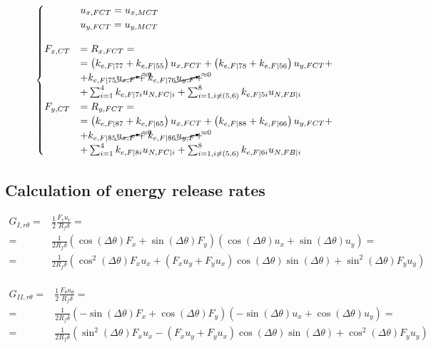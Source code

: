 \documentclass[a4paper]{jpconf}
\begin{document}
\begin{equation}
\begin{cases}
&u_{x,FCT}=u_{x,MCT}\\
&u_{y,FCT}=u_{y,MCT}\\[10pt]
F_{x,CT}&=R_{x,FCT}=\\&=\left(k_{e,F|77}+k_{e,F|55}\right)u_{x,FCT}+\left(k_{e,F|78}+k_{e,F|56}\right)u_{y,FCT}+\\
&+k_{e,F|75}\cancelto{\approx 0}{u_{x,F}}+k_{e,F|76}\cancelto{\approx 0}{u_{y,F}}+\\
&+\sum_{i=1}^{4}k_{e,F|7i}u_{N,FC|i}+\sum_{i=1,i\neq\left(5,6\right)}^{8}k_{e,F|5i}u_{N,FB|i}\\
F_{y,CT}&=R_{y,FCT}=\\&=\left(k_{e,F|87}+k_{e,F|65}\right)u_{x,FCT}+\left(k_{e,F|88}+k_{e,F|66}\right)u_{y,FCT}+\\
&+k_{e,F|85}\cancelto{\approx 0}{u_{x,F}}+k_{e,F|86}\cancelto{\approx 0}{u_{y,F}}+\\
&+\sum_{i=1}^{4}k_{e,F|8i}u_{N,FC|i}+\sum_{i=1,i\neq\left(5,6\right)}^{8}k_{e,F|6i}u_{N,FB|i}\\
\end{cases}
\end{equation}

\subsection{Calculation of energy release rates}

\begin{equation}
\begin{split}
G_{I,r\theta} = &\frac{1}{2}\frac{F_{r}u_{r}}{R_{f}\delta}=\\
= &\frac{1}{2R_{f}\delta}\left(\cos\left(\Delta\theta\right) F_{x}+\sin\left(\Delta\theta\right)F_{y}\right)\left(\cos\left(\Delta\theta\right) u_{x}+\sin\left(\Delta\theta\right) u_{y}\right)=\\
= &\frac{1}{2R_{f}\delta}\left(\cos^{2}\left(\Delta\theta\right) F_{x}u_{x}+\left(F_{x}u_{y}+F_{y}u_{x}\right)\cos\left(\Delta\theta\right)\sin\left(\Delta\theta\right)+\sin^{2}\left(\Delta\theta\right)F_{y}u_{y}\right)\\
\end{split}
\end{equation}

\begin{equation}
\begin{split}
G_{II,r\theta} = &\frac{1}{2}\frac{F_{\theta}u_{\theta}}{R_{f}\delta}=\\
= &\frac{1}{2R_{f}\delta}\left(-\sin\left(\Delta\theta\right) F_{x}+\cos\left(\Delta\theta\right)F_{y}\right)\left(-\sin\left(\Delta\theta\right) u_{x}+\cos\left(\Delta\theta\right) u_{y}\right)=\\
= &\frac{1}{2R_{f}\delta}\left(\sin^{2}\left(\Delta\theta\right) F_{x}u_{x}-\left(F_{x}u_{y}+F_{y}u_{x}\right)\cos\left(\Delta\theta\right)\sin\left(\Delta\theta\right)+\cos^{2}\left(\Delta\theta\right)F_{y}u_{y}\right)\\
\end{split}
\end{equation}
\end{document}
